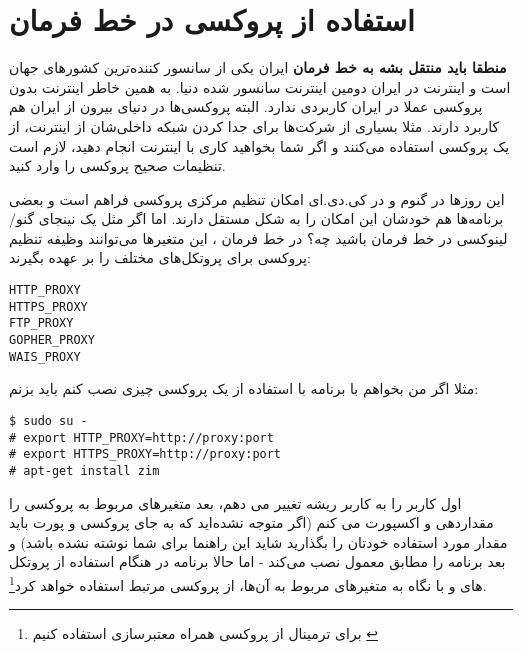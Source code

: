 \section{استفاده از پروکسی در خط فرمان}
\textbf{منطقا باید منتقل بشه به خط فرمان}
ایران یکی از سانسور کننده‌ترین کشورهای جهان است و اینترنت در ایران دومین اینترنت سانسور شده دنیا. به همین خاطر اینترنت بدون پروکسی عملا در ایران کاربردی ندارد. البته پروکسی‌ها در دنیای بیرون از ایران هم کاربرد دارند. مثلا بسیاری از شرکت‌ها برای جدا کردن شبکه داخلی‌شان از اینترنت، از یک پروکسی استفاده می‌کنند و اگر شما بخواهید کاری با اینترنت انجام دهید، لازم است تنظیمات صحیح پروکسی را وارد کنید.

این روزها در گنوم و در کی.دی.ای امکان تنظیم مرکزی پروکسی فراهم است و بعضی برنامه‌ها هم خودشان این امکان را به شکل مستقل دارند. اما اگر مثل یک نینجای گنو/لینوکسی در خط فرمان باشید چه؟ در خط فرمان 
، این متغیرها می‌توانند وظیفه تنظیم پروکسی برای پروتکل‌های مختلف را بر عهده بگیرند:
\begin{frameng}
\begin{lstlisting}
HTTP_PROXY
HTTPS_PROXY
FTP_PROXY
GOPHER_PROXY
WAIS_PROXY
\end{lstlisting}
\end{frameng}
مثلا اگر من بخواهم با برنامه  با استفاده از یک پروکسی چیزی نصب کنم باید بزنم:
\begin{frameng}
\begin{lstlisting}
$ sudo su -
# export HTTP_PROXY=http://proxy:port
# export HTTPS_PROXY=http://proxy:port
# apt-get install zim
\end{lstlisting}
\end{frameng}
اول کاربر را به کاربر ریشه تغییر می دهم، بعد متغیرهای مربوط به پروکسی را مقداردهی و اکسپورت می کنم (اگر متوجه نشده‌اید که به جای پروکسی و پورت باید مقدار مورد استفاده خودتان را بگذارید شاید این راهنما برای شما نوشته نشده باشد) و بعد برنامه را مطابق معمول نصب می‌کند - اما حالا برنامه
 در هنگام استفاده از پروتکل های
 و 
 با نگاه به متغیرهای مربوط به آن‌ها، از پروکسی مرتبط استفاده خواهد کرد\footnote{برای ترمینال از پروکسی همراه معتبر‌سازی استفاده کنیم
\href{http://cyletech.blogspot.de2013/06/blog-post_8.html}{}}.
